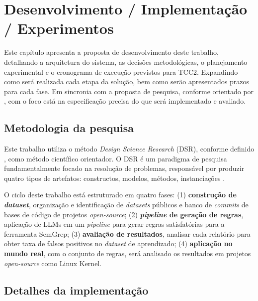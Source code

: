 \documentclass[
    12pt,                %
    openright,           %
    oneside,             %
    a4paper,             %
    english,             %
    brazil               %
]{abntex2}
\begin{document}
\chapter{Desenvolvimento / Implementação / Experimentos}
\label{cap:desenvolvimento}
\par
Este capítulo apresenta a proposta de desenvolvimento deste trabalho, detalhando a arquitetura do sistema, as decisões metodológicas, o planejamento experimental e o cronograma de execução previstos para TCC2. 
Expandindo como será realizada cada etapa da solução, bem como serão apresentados prazos para cada fase.
Em sincronia com a proposta de pesquisa, conforme orientado por , com o foco está na especificação precisa do que será implementado e avaliado.

\section{Metodologia da pesquisa}
\label{sec:metodologia_pesquisa}
\par
Este trabalho utiliza o método \textit{Design Science Research} (DSR), conforme definido , como método científico orientador.
O DSR é um paradigma de pesquisa fundamentalmente focado na resolução de problemas, responsável por produzir quatro tipos de artefatos: constructos, modelos, métodos, instanciações \cite{hevner2004design}.
\par
O ciclo deste trabalho está estruturado em quatro fases:
(1) \textbf{construção de \textit{dataset}}, organização e identificação de \textit{datasets} públicos e banco de \textit{commits} de bases de código de projetos \textit{open-source};
(2) \textbf{\textit{pipeline} de geração de regras}, aplicação de LLMs em um \textit{pipeline} para gerar regras satisfatórias para a ferramenta SemGrep;
(3) \textbf{avaliação de resultados}, analisar cada relatório para obter taxa de falsos positivos no \textit{dataset} de aprendizado;
(4) \textbf{aplicação no mundo real}, com o conjunto de regras, será analisado os resultados em projetos \textit{open-source} como Linux Kernel.

\section{Detalhes da implementação}
\label{sec:implementacao}
\end{document}
